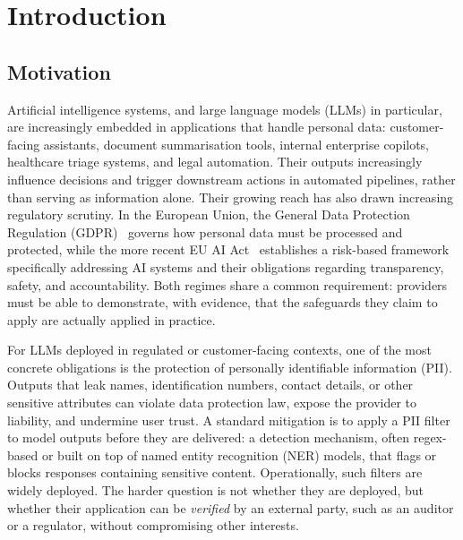 \chapter{Introduction}
\label{chap:introduction}

\section{Motivation}
\label{sec:motivation}

Artificial intelligence systems, and large language models (LLMs) in particular, are increasingly embedded in applications that handle personal data: customer-facing assistants, document summarisation tools, internal enterprise copilots, healthcare triage systems, and legal automation. Their outputs increasingly influence decisions and trigger downstream actions in automated pipelines, rather than serving as information alone. Their growing reach has also drawn increasing regulatory scrutiny. In the European Union, the General Data Protection Regulation (GDPR)~\cite{gdpr2016} governs how personal data must be processed and protected, while the more recent EU AI Act~\cite{aiact2024} establishes a risk-based framework specifically addressing AI systems and their obligations regarding transparency, safety, and accountability. Both regimes share a common requirement: providers must be able to demonstrate, with evidence, that the safeguards they claim to apply are actually applied in practice.

\medskip

For LLMs deployed in regulated or customer-facing contexts, one of the most concrete obligations is the protection of personally identifiable information (PII). Outputs that leak names, identification numbers, contact details, or other sensitive attributes can violate data protection law, expose the provider to liability, and undermine user trust. A standard mitigation is to apply a PII filter to model outputs before they are delivered: a detection mechanism, often regex-based or built on top of named entity recognition (NER) models, that flags or blocks responses containing sensitive content. Operationally, such filters are widely deployed. The harder question is not whether they are deployed, but whether their application can be \emph{verified} by an external party, such as an auditor or a regulator, without compromising other interests.

\medskip

